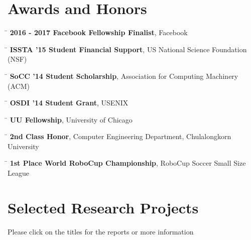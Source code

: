 \documentclass[10pt]{article} %
\begin{document}
\section{Awards and Honors}

\begin{tabbing}
\hspace{2.5cm} \=  \> \textbf{2016 - 2017 Facebook Fellowship Finalist}, Facebook
\end{tabbing}

\begin{tabbing}
\hspace{2.5cm} \=  \> \textbf{ISSTA '15 Student Financial Support}, US National Science Foundation (NSF)
\end{tabbing}

\begin{tabbing}
\hspace{2.5cm} \=  \> \textbf{SoCC '14 Student Scholarship}, Association for Computing Machinery (ACM)
\end{tabbing}

\begin{tabbing}
\hspace{2.5cm} \=  \> \textbf{OSDI '14 Student Grant}, USENIX
\end{tabbing}

\begin{tabbing}
\hspace{2.5cm} \=  \> \textbf{UU Fellowship}, University of Chicago
\end{tabbing}

\begin{tabbing}
\hspace{2.5cm} \=  \> \textbf{2nd Class Honor}, Computer Engineering Department, Chulalongkorn University
\end{tabbing}

\begin{tabbing}
\hspace{2.5cm} \=  \> \textbf{1st Place World RoboCup Championship}, RoboCup Soccer Small Size League
\end{tabbing}


\section{Selected Research Projects}
\vspace{-4mm}
{\footnotesize Please click on the titles for the reports or more information}
\end{document}
